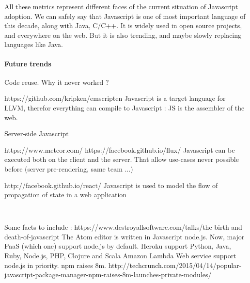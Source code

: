 All these metrics represent different faces of the current situation of Javascript adoption.
We can safely say that Javascript is one of most important language of this decade, along with Java, C/C++.
It is widely used in open source projects, and everywhere on the web.
But it is also trending, and maybe slowly replacing languages like Java.

\paragraph{Future trends}


Code reuse.
Why it never worked ?





https://github.com/kripken/emscripten
Javascript is a target language for LLVM, therefor everything can compile to Javascript : JS is the assembler of the web.


Server-side Javascript

https://www.meteor.com/
https://facebook.github.io/flux/
Javascript can be executed both on the client and the server.
That allow use-cases never possible before (server pre-rendering, same team ...)


http://facebook.github.io/react/
Javascript is used to model the flow of propagation of state in a web application



---

Some facts to include :
https://www.destroyallsoftware.com/talks/the-birth-and-death-of-javascript
The Atom editor is written in Javascript node.js.
Now, major PaaS (which one) support node.js by default.
Heroku support Python, Java, Ruby, Node.js, PHP, Clojure and Scala
Amazon Lambda Web service support node.js in priority.
npm raises 8m.
http://techcrunch.com/2015/04/14/popular-javascript-package-manager-npm-raises-8m-launches-private-modules/


